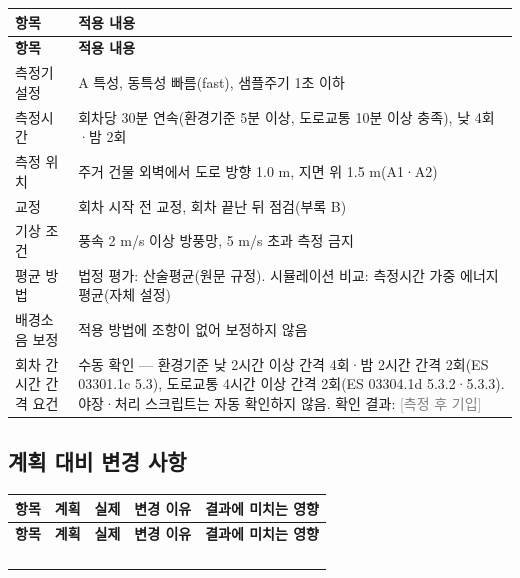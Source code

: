 \documentclass[10.5pt,a4paper]{article}
\newcommand{\TBD}{\textcolor{gray}{[측정 후 기입]}}
\newcommand{\hd}[1]{\cellcolor{headfill}\textbf{\sffamily #1}}
\newcommand{\ip}{\cellcolor{inp}}
\newcommand{\hr}[1]{\rule[-0.35\dimexpr#1\relax]{0pt}{#1}}
\begin{document}
\begin{longtable}{>{\raggedright\arraybackslash}p{}>{\raggedright\arraybackslash}p{}}
\toprule
\hd{항목} & \hd{적용 내용} \\ \midrule
\endfirsthead
\toprule
\hd{항목} & \hd{적용 내용} \\ \midrule
\endhead
\bottomrule
\endlastfoot
측정기 설정 & A 특성, 동특성 빠름(fast), 샘플주기 1초 이하 \\ \midrule
측정시간 & 회차당 30분 연속(환경기준 5분 이상, 도로교통 10분 이상 충족), 낮 4회·밤 2회 \\ \midrule
측정 위치 & 주거 건물 외벽에서 도로 방향 1.0 m, 지면 위 1.5 m(A1·A2) \\ \midrule
교정 & 회차 시작 전 교정, 회차 끝난 뒤 점검(부록 B) \\ \midrule
기상 조건 & 풍속 2 m/s 이상 방풍망, 5 m/s 초과 측정 금지 \\ \midrule
평균 방법 & 법정 평가: 산술평균(원문 규정). 시뮬레이션 비교: 측정시간 가중 에너지평균(자체 설정) \\ \midrule
배경소음 보정 & 적용 방법에 조항이 없어 보정하지 않음 \\ \midrule
회차 간 시간 간격 요건 & 수동 확인 --- 환경기준 낮 2시간 이상 간격 4회·밤 2시간 간격 2회(ES 03301.1c 5.3), 도로교통 4시간 이상 간격 2회(ES 03304.1d 5.3.2·5.3.3). 야장·처리 스크립트는 자동 확인하지 않음. 확인 결과: \TBD \\
\end{longtable}
\addtocounter{table}{-1}
\normalsize
{}\subsection{계획 대비 변경 사항}
\small
\begin{longtable}{>{\raggedright\arraybackslash}p{}>{\raggedright\arraybackslash}p{}>{\raggedright\arraybackslash}p{}>{\raggedright\arraybackslash}p{}>{\raggedright\arraybackslash}p{}}
\toprule
\hd{항목} & \hd{계획} & \hd{실제} & \hd{변경 이유} & \hd{결과에 미치는 영향} \\ \midrule
\endfirsthead
\toprule
\hd{항목} & \hd{계획} & \hd{실제} & \hd{변경 이유} & \hd{결과에 미치는 영향} \\ \midrule
\endhead
\bottomrule
\endlastfoot
\ip{}\hr{10mm} & \ip{} & \ip{} & \ip{} & \ip{} \\ \midrule
\ip{}\hr{10mm} & \ip{} & \ip{} & \ip{} & \ip{} \\ \midrule
\ip{}\hr{10mm} & \ip{} & \ip{} & \ip{} & \ip{} \\ \midrule
\ip{}\hr{10mm} & \ip{} & \ip{} & \ip{} & \ip{} \\
\end{longtable}
\end{document}
